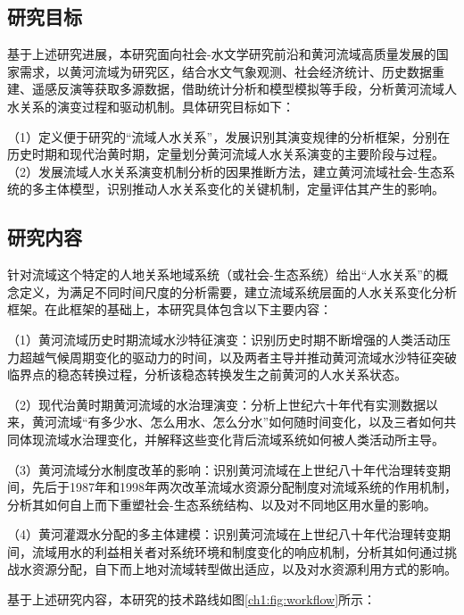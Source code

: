 
\subsection{研究目标}
基于上述研究进展，本研究面向社会-水文学研究前沿和黄河流域高质量发展的国家需求，以黄河流域为研究区，结合水文气象观测、社会经济统计、历史数据重建、遥感反演等获取多源数据，借助统计分析和模型模拟等手段，分析黄河流域人水关系的演变过程和驱动机制。具体研究目标如下：

（1）定义便于研究的“流域人水关系”，发展识别其演变规律的分析框架，分别在历史时期和现代治黄时期，定量划分黄河流域人水关系演变的主要阶段与过程。
（2）发展流域人水关系演变机制分析的因果推断方法，建立黄河流域社会-生态系统的多主体模型，识别推动人水关系变化的关键机制，定量评估其产生的影响。


\subsection{研究内容}

针对流域这个特定的人地关系地域系统（或社会-生态系统）给出“人水关系”的概念定义，为满足不同时间尺度的分析需要，建立流域系统层面的人水关系变化分析框架。在此框架的基础上，本研究具体包含以下主要内容：

（1）黄河流域历史时期流域水沙特征演变：识别历史时期不断增强的人类活动压力超越气候周期变化的驱动力的时间，以及两者主导并推动黄河流域水沙特征突破临界点的稳态转换过程，分析该稳态转换发生之前黄河的人水关系状态。

（2）现代治黄时期黄河流域的水治理演变：分析上世纪六十年代有实测数据以来，黄河流域“有多少水、怎么用水、怎么分水”如何随时间变化，以及三者如何共同体现流域水治理变化，并解释这些变化背后流域系统如何被人类活动所主导。

（3）黄河流域分水制度改革的影响：识别黄河流域在上世纪八十年代治理转变期间，先后于1987年和1998年两次改革流域水资源分配制度对流域系统的作用机制，分析其如何自上而下重塑社会-生态系统结构、以及对不同地区用水量的影响。

（4）黄河灌溉水分配的多主体建模：识别黄河流域在上世纪八十年代治理转变期间，流域用水的利益相关者对系统环境和制度变化的响应机制，分析其如何通过挑战水资源分配，自下而上地对流域转型做出适应，以及对水资源利用方式的影响。

基于上述研究内容，本研究的技术路线如图\ref{ch1:fig:workflow}所示：

